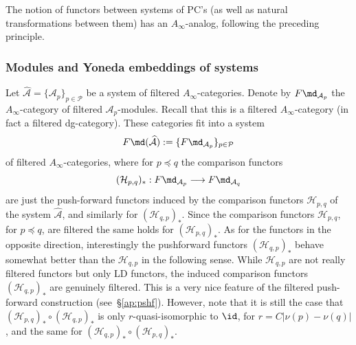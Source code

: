The notion of functors between systems of PC's (as well as natural
transformations between them) has an $A_{\infty}$-analog, following
the preceding principle.

\subsubsection{Modules and Yoneda embeddings of
  systems} \label{sbsb:yoneda-sys}

Let $\widehat{\mathcal{A}} = \{\mathcal{A}_p\}_{p \in \mathcal{P}}$ be
a system of filtered $A_{\infty}$-categories. Denote by
$F\md_{\mathcal{A}_p}$ the $A_{\infty}$-category of filtered
$\mathcal{A}_p$-modules. Recall that this is a filtered
$A_{\infty}$-category (in fact a filtered dg-category). These
categories fit into a system
$$F\md(\widehat{\mathcal{A}}) := \{ F\md_{\mathcal{A}_p} \}_{p \in
  \mathcal{P}}$$ of filtered $A_{\infty}$-categories, where for
$p \preceq q$ the comparison functors
$$(\mathcal{H}_{p,q})_* : F\md_{\mathcal{A}_p} \longrightarrow
F\md_{\mathcal{A}_q}$$ are just the push-forward functors induced by
the comparison functors $\mathcal{H}_{p,q}$ of the system
$\widehat{\mathcal{A}}$, and similarly for $(\mathcal{H}_{q,p})_*$.
Since the comparison functors $\mathcal{H}_{p,q}$, for $p \preceq q$,
are filtered the same holds for $(\mathcal{H}_{p,q})_*$. As for the
functors in the opposite direction, interestingly the pushforward
functors $(\mathcal{H}_{q,p})_*$ behave somewhat better than the
$\mathcal{H}_{q,p}$ in the following sense. While $\mathcal{H}_{q,p}$
are not really filtered functors but only LD functors, the induced
comparison functors $(\mathcal{H}_{q,p})_*$ are genuinely
filtered. This is a very nice feature of the filtered push-forward
construction (see~\S\ref{ap:pshf}). However, note that it is still the
case that $(\mathcal{H}_{p,q})_* \circ (\mathcal{H}_{q,p})_*$ is only
$r$-quasi-isomorphic to $\id$, for $r = C | \nu(p) - \nu(q)|$, and the
same for $(\mathcal{H}_{q,p})_* \circ (\mathcal{H}_{p,q})_*$.


